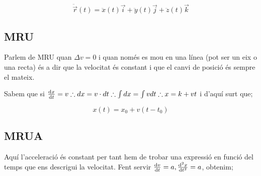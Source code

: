 \documentclass[12pt]{article}
\newcommand{\axes}[4]{%
  \draw[ax] (0,0) -- (#1,0) node[right, black] {#3};
  \draw[ax] (0,0) -- (0,#2) node[above, black] {#4};}
\begin{document}
\[\ddot{\vec{r}}(t) = \ddot{x}(t)\vec{i} + \ddot{y}(t)\vec{j} + \ddot{z}(t)\vec{k}\]

\subsection{MRU}

Parlem de MRU quan $\Delta v = 0$ i quan només es mou en una línea (pot ser un eix o una recta) és a dir que la velocitat és constant i que el canvi de posició és sempre el mateix.

\begin{center}
\end{center}

Sabem que si $\dv{x}{t} = v \therefore dx = v\cdot dt \therefore \int dx = \int v dt \therefore x = k + vt$ i d'aquí surt que;

\[x(t) = x_0 + v(t-t_0)\]

\subsection{MRUA}

Aquí l'acceleració és constant per tant hem de trobar una expressió en funció del temps que ens descrigui la velocitat. Fent servir $\dv{v}{t} = a, \dv[2]{x}{t} = a$, obtenim;

\begin{center}
\end{center}

\begin{center}
\end{center}
\end{document}
